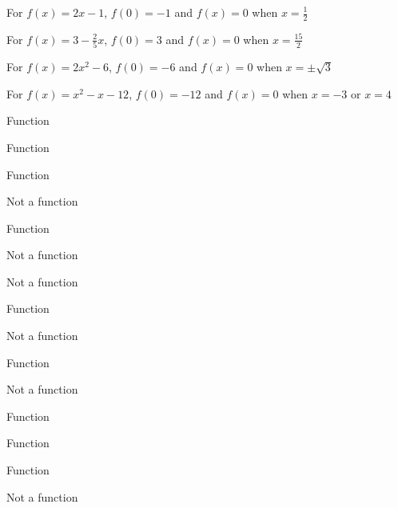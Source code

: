 \begin{exenum}
\item For $f(x) = 2x-1$,  $f(0) = -1$ and $f(x) = 0$ when $x = \frac{1}{2}$

\item For $f(x) =  3 - \frac{2}{5} x$, $f(0) = 3$ and $f(x) = 0$ when $x = \frac{15}{2}$

\item For $f(x) =  2x^2-6$, $f(0) = -6$ and $f(x) = 0$ when $x = \pm \sqrt{3}$

\item For $f(x) =  x^2-x-12$, $f(0) = -12$ and $f(x) = 0$ when $x = -3$ or $x=4$

\end{exenum}

\begin{shortexenum}

\item Function
\item Function
\item Function
\item Not a function
\item Function
\item Not a function
\item Not a function
\item Function
\item Not a function
\item Function
\item Not a function
\item Function
\item Function
\item Function
\item Not a function

\end{shortexenum}

